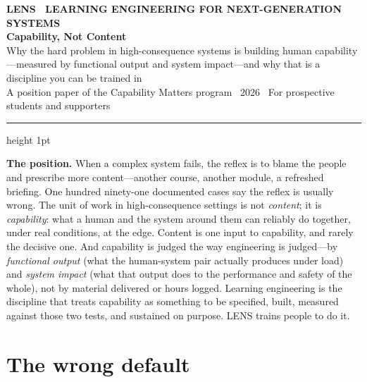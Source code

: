 \documentclass[11pt]{article}
\newcommand{\lead}[1]{{\color{lensaccent}\bfseries #1}}
\begin{document}
\begin{flushleft}
{\footnotesize\color{lensaccent}\bfseries LENS \textbullet\ LEARNING ENGINEERING FOR NEXT-GENERATION SYSTEMS}\\[0.9em]
{\color{lensink}\fontsize{27}{31}\selectfont\bfseries Capability, Not Content}\\[0.35em]
{\color{lensink}\large Why the hard problem in high-consequence systems is building human capability---measured by functional output and system impact---and why that is a discipline you can be trained in}\\[1.1em]
{\footnotesize\color{lensquote}A position paper of the Capability Matters program \textbullet\ 2026 \textbullet\ For prospective students and supporters}
\end{flushleft}

\vspace{0.3em}
{\color{lensrule}\hrule height 1pt}
\vspace{1.2em}

\begin{thesisbox}
\lead{The position.} When a complex system fails, the reflex is to blame the people and prescribe more content---another course, another module, a refreshed briefing. One hundred ninety-one documented cases say the reflex is usually wrong. The unit of work in high-consequence settings is not \emph{content}; it is \emph{capability}: what a human and the system around them can reliably do together, under real conditions, at the edge. Content is one input to capability, and rarely the decisive one. And capability is judged the way engineering is judged---by \emph{functional output} (what the human-system pair actually produces under load) and \emph{system impact} (what that output does to the performance and safety of the whole), not by material delivered or hours logged. Learning engineering is the discipline that treats capability as something to be specified, built, measured against those two tests, and sustained on purpose. LENS trains people to do it.
\end{thesisbox}

\section{The wrong default}
\end{document}
